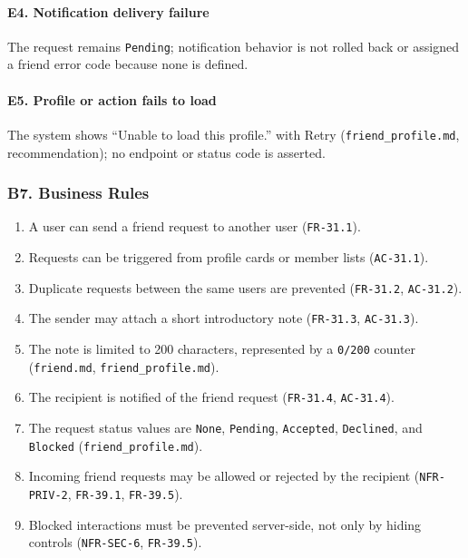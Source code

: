 \documentclass[12pt]{article}
\begin{document}
\hypertarget{sec:e4-notification-delivery-failure}{}
\paragraph*{E4. Notification delivery failure}
\par\medskip

The request remains \texttt{Pending}; notification behavior is not rolled back or assigned a friend error code because none is defined.
\par\medskip

\hypertarget{sec:e5-profile-or-action-fails-to-load}{}
\paragraph*{E5. Profile or action fails to load}
\par\medskip

The system shows “Unable to load this profile.” with Retry (\texttt{friend\_profile.md}, recommendation); no endpoint or status code is asserted.
\par\medskip

\hypertarget{sec:b7-business-rules}{}
\subsubsection*{B7. Business Rules}
\par\medskip

\begin{enumerate}
\item A user can send a friend request to another user (\texttt{FR-31.1}).
\item Requests can be triggered from profile cards or member lists (\texttt{AC-31.1}).
\item Duplicate requests between the same users are prevented (\texttt{FR-31.2}, \texttt{AC-31.2}).
\item The sender may attach a short introductory note (\texttt{FR-31.3}, \texttt{AC-31.3}).
\item The note is limited to 200 characters, represented by a \texttt{0/200} counter (\texttt{friend.md}, \texttt{friend\_profile.md}).
\item The recipient is notified of the friend request (\texttt{FR-31.4}, \texttt{AC-31.4}).
\item The request status values are \texttt{None}, \texttt{Pending}, \texttt{Accepted}, \texttt{Declined}, and \texttt{Blocked} (\texttt{friend\_profile.md}).
\item Incoming friend requests may be allowed or rejected by the recipient (\texttt{NFR-PRIV-2}, \texttt{FR-39.1}, \texttt{FR-39.5}).
\item Blocked interactions must be prevented server-side, not only by hiding controls (\texttt{NFR-SEC-6}, \texttt{FR-39.5}).
\end{enumerate}
\par\medskip
\end{document}
